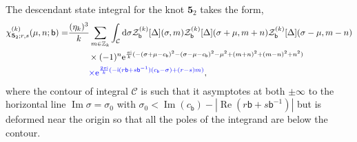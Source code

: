 \documentclass[a4paper,11pt]{article}	%
\DeclareMathOperator{\real}{Re}
\DeclareMathOperator{\imag}{Im}
\def\mc{\mathcal}
\def\md{\mathbf}
\def\ms{\mathsf}
\def\IZ{\mathbb{Z}}
\newcommand{\re}{{\rm e}}
\newcommand{\ri}{{\mathsf{i}}}
\newcommand{\rd}{{\rm d}}
\newcommand{\nn}{\nonumber \\}
\newcommand{\bb}{\ms{b}}
\newcommand{\s}{\sigma}
\newcommand{\knot}[1]{\md{#1}}
\begin{document}
The descendant state integral for the knot $\knot{5}_2$ takes the form,
\begin{align}
  \chi^{(k)}_{\knot{5}_2;r,s}(\mu,n;\bb) =
  &\frac{(\eta_k)^3}{k}\sum_{m\in\IZ_k}\int_{\mc{C}}
    \rd \sigma
    \mc{Z}^{(k)}_\bb[\Delta](\sigma,m)
    \mc{Z}^{(k)}_\bb[\Delta](\sigma+\mu,m+n)
    \mc{Z}^{(k)}_\bb[\Delta](\sigma-\mu,m-n)\nn
  &\phantom{===}\times(-1)^{n}
    \re^{\frac{\pi\ri}{k}(-(\sigma+\mu-c_\bb)^2-(\sigma-\mu-c_\bb)^2-\mu^2+(m+n)^2+(m-n)^2+n^2)}\nn
  &\phantom{===}{\textcolor{blue}{\times\re^{\frac{2\pi\ri}{k}(-\ri(r\bb+s\bb^{-1})(c_\bb-\s)+(r-s)m)}}},
\end{align}
where the contour of integral $\mc{C}$ is such that it asymptotes at
both $\pm\infty$ to the horizontal line $\imag \s = \s_0$ with
$\sigma_0 <\imag(c_\bb)-|\real(r\bb+s\bb^{-1})|$ but is deformed near
the origin so that all the poles of the integrand are below the
contour.
\end{document}
